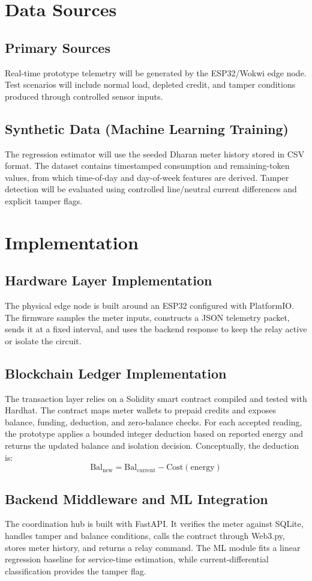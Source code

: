 \section{Data Sources}
\subsection{Primary Sources}
Real-time prototype telemetry will be generated by the ESP32/Wokwi edge node. Test scenarios will include normal load, depleted credit, and tamper conditions produced through controlled sensor inputs.
\subsection{Synthetic Data (Machine Learning Training)}
The regression estimator will use the seeded Dharan meter history stored in CSV format. The dataset contains timestamped consumption and remaining-token values, from which time-of-day and day-of-week features are derived. Tamper detection will be evaluated using controlled line/neutral current differences and explicit tamper flags.

\section{Implementation}
\subsection{Hardware Layer Implementation}
The physical edge node is built around an ESP32 configured with PlatformIO. The firmware samples the meter inputs, constructs a JSON telemetry packet, sends it at a fixed interval, and uses the backend response to keep the relay active or isolate the circuit.
\subsection{Blockchain Ledger Implementation}
The transaction layer relies on a Solidity smart contract compiled and tested with Hardhat. The contract maps meter wallets to prepaid credits and exposes balance, funding, deduction, and zero-balance checks. For each accepted reading, the prototype applies a bounded integer deduction based on reported energy and returns the updated balance and isolation decision. Conceptually, the deduction is: \cite{ref6}$$\text{Bal}_{\text{new}} = \text{Bal}_{\text{current}} - \text{Cost}(\text{energy})$$
\subsection{Backend Middleware and ML Integration}
The coordination hub is built with FastAPI. It verifies the meter against SQLite, handles tamper and balance conditions, calls the contract through Web3.py, stores meter history, and returns a relay command. The ML module fits a linear regression baseline for service-time estimation, while current-differential classification provides the tamper flag.\cite{ref7}

